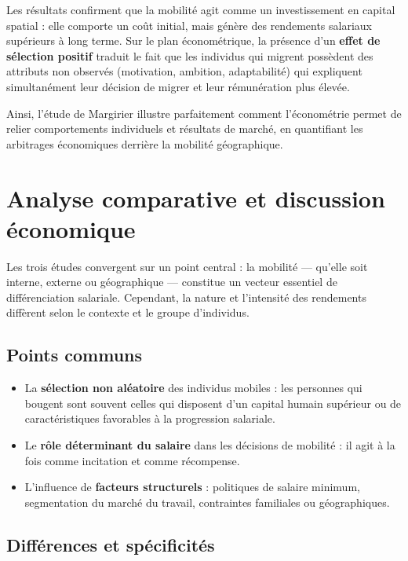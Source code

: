 \documentclass[12pt,a4paper]{article}
\begin{document}
Les résultats confirment que la mobilité agit comme un investissement en capital spatial : elle comporte un coût initial, mais génère des rendements salariaux supérieurs à long terme.  
Sur le plan économétrique, la présence d’un \textbf{effet de sélection positif} traduit le fait que les individus qui migrent possèdent des attributs non observés (motivation, ambition, adaptabilité) qui expliquent simultanément leur décision de migrer et leur rémunération plus élevée.

Ainsi, l’étude de Margirier illustre parfaitement comment l’économétrie permet de relier comportements individuels et résultats de marché, en quantifiant les arbitrages économiques derrière la mobilité géographique.

\section{Analyse comparative et discussion économique}

Les trois études convergent sur un point central : la mobilité — qu’elle soit interne, externe ou géographique — constitue un vecteur essentiel de différenciation salariale.  
Cependant, la nature et l’intensité des rendements diffèrent selon le contexte et le groupe d’individus.

\subsection{Points communs}

\begin{itemize}
    \item La \textbf{sélection non aléatoire} des individus mobiles : les personnes qui bougent sont souvent celles qui disposent d’un capital humain supérieur ou de caractéristiques favorables à la progression salariale.
    \item Le \textbf{rôle déterminant du salaire} dans les décisions de mobilité : il agit à la fois comme incitation et comme récompense.
    \item L’influence de \textbf{facteurs structurels} : politiques de salaire minimum, segmentation du marché du travail, contraintes familiales ou géographiques.
\end{itemize}

\subsection{Différences et spécificités}
\end{document}
